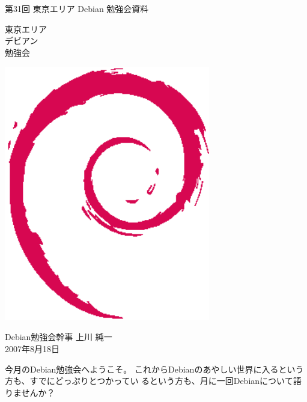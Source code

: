 \documentclass[mingoth,a4paper]{jsarticle}
\newcommand{\debmtgyear}{2007}
\newcommand{\debmtgdate}{18}
\newcommand{\debmtgmonth}{8}
\newcommand{\debmtgnumber}{31}
\begin{document}
\begin{titlepage}


 第\debmtgnumber{}回 東京エリア Debian 勉強会資料

\vspace{2cm}

\begin{minipage}[t]{0.6\hsize}
\vspace{-2cm}
{\fontsize{60}{60}
{\gt
\color{dancerdarkblue}
東京エリア \\
デビアン \\
勉強会
}}
\end{minipage}
\begin{minipage}[b]{0.4\hsize}
\hspace{-1cm}\includegraphics[width=9cm]{image200502/openlogo-nd.eps}
\end{minipage}

\vspace{3cm}
\hfill{}Debian勉強会幹事 上川 純一\\
\hfill{}\debmtgyear{}年\debmtgmonth{}月\debmtgdate{}日

\thispagestyle{empty}
\end{titlepage}



今月のDebian勉強会へようこそ。
 これからDebianのあやしい世界に入るという方も、すでにどっぷりとつかってい
 るという方も、月に一回Debianについて語りませんか？
\end{document}
